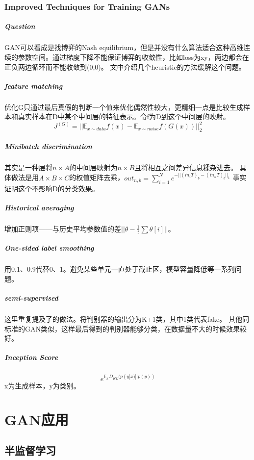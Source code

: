 \documentclass[a4paper]{article}
\begin{document}
\subsubsection{Improved Techniques for Training GANs\cite{DBLP:journals/corr/SalimansGZCRC16}}
\subparagraph{Question}
GAN可以看成是找博弈的Nash equilibrium，但是并没有什么算法适合这种高维连续的参数空间。通过梯度下降不能保证博弈的收敛性，比如loss为xy，两边都会在正负两边循环而不能收敛到(0,0)。
文中介绍几个heuristic的方法缓解这个问题。
 \subparagraph{feature matching}
优化G只通过最后真假的判断一个值来优化偶然性较大，更精细一点是比较生成样本和真实样本在D中某个中间层的特征表示。令f为D到这个中间层的映射。
$$J^{(G)}=||\mathbb{E}_{x\sim data}f(x)-\mathbb{E}_{x\sim noise}f(G(x))||^2_2$$
 \subparagraph{Minibatch discrimination}
其实是一种层将$n\times A$的中间层映射为$n\times B$且将相互之间差异信息糅杂进去。
具体做法是用$A\times B \times C$的权值矩阵去乘，$out_{n,b}=\sum\limits_{i=1}^N e^{-||(in_iT)_b - (in_nT)_b||_1}$
事实证明这个不影响D的分类效果。
 \subparagraph{Historical averaging}
增加正则项——与历史平均参数值的差$||\theta - \frac{1}{t}\sum \theta[i]||$。
 \subparagraph{One-sided label smoothing}
用0.1、0.9代替0、1。避免某些单元一直处于截止区，模型容量降低等一系列问题。
 \subparagraph{semi-supervised}
这里重复提及了\cite{DBLP:journals/corr/Odena16a}的做法。将判别器的输出分为K+1类，其中1类代表fake。
其他同标准的GAN类似，这样最后得到的判别器能够分类，在数据量不大的时候效果较好。
 \subparagraph{Inception Score}
$$e^{\mathbb{E}_xD_{KL}(p(y|x)||p(y))}$$
x为生成样本，y为类别。


\section{GAN应用}
\subsection{半监督学习}
\end{document}
